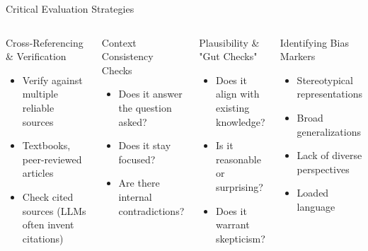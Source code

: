 \documentclass{beamer}
\begin{document}
\begin{frame}{Critical Evaluation Strategies}
\begin{columns}
\begin{block}{Cross-Referencing \& Verification}
\begin{itemize}
  \item Verify against multiple reliable sources
  \item Textbooks, peer-reviewed articles
  \item Check cited sources (LLMs often invent citations)
\end{itemize}
\end{block}

\pause

\begin{block}{Context Consistency Checks}
\begin{itemize}
  \item Does it answer the question asked?
  \item Does it stay focused?
  \item Are there internal contradictions?
\end{itemize}
\end{block}

\pause

\begin{block}{Plausibility \& "Gut Checks"}
\begin{itemize}
  \item Does it align with existing knowledge?
  \item Is it reasonable or surprising?
  \item Does it warrant skepticism?
\end{itemize}
\end{block}

\pause

\begin{block}{Identifying Bias Markers}
\begin{itemize}
  \item Stereotypical representations
  \item Broad generalizations
  \item Lack of diverse perspectives
  \item Loaded language
\end{itemize}
\end{block}
\end{columns}
\end{frame}
\end{document}
